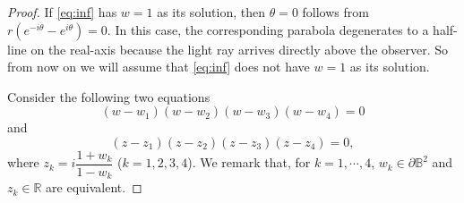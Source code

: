 \documentclass[12pt,a4paper]{amsart}
\theoremstyle{plain}
\theoremstyle{definition}
\theoremstyle{remark}
\numberwithin{equation}{section}
\begin{document}
\noindent \begin{proof}
If \eqref{eq:inf} has $ w=1 $ as its solution, 
then $ \theta=0 $ follows from $ r(e^{-i\theta}-e^{i\theta})=0 $.
In this case, the corresponding parabola degenerates to a 
half-line on the real-axis because the light ray arrives 
directly above the observer.
So from now on we will assume that \eqref{eq:inf}
does not have $w=1$ as its solution.

Consider the following two equations
\begin{equation}\label{eq:D}
  (w-w_1)(w-w_2)(w-w_3)(w-w_4)=0
\end{equation}
and
\begin{equation}\label{eq:R}
  (z-z_1)(z-z_2)(z-z_3)(z-z_4)=0,
\end{equation}
where $ z_k=i\dfrac{1+w_k}{1-w_k} $ ($ k=1,2,3,4 $).
We remark that, for $ k=1,\cdots,4 $,  $ w_k\in\partial \mathbb{B}^2 $
and $ z_k\in\mathbb{R} $ are equivalent.


\end{proof}
\end{document}
